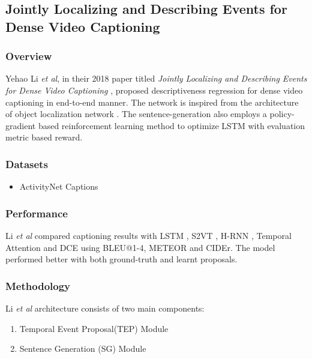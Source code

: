 \subsection{Jointly Localizing and Describing Events for Dense Video Captioning}

\subsubsection{Overview}

\par Yehao Li \textit{et al}, in their 2018 paper titled \textit{Jointly Localizing and Describing Events for Dense Video Captioning} \cite{li2018jointly}, proposed descriptiveness regression for dense video captioning in end-to-end manner. The network is inspired from the architecture of object localization network \cite{ren2016faster}. The sentence-generation also employs a policy-gradient based reinforcement learning method to optimize LSTM with evaluation metric based reward.


\subsubsection{Datasets}
\begin{itemize}
\item ActivityNet Captions
\end{itemize}

\subsubsection{Performance}
\par Li \textit{et al} compared captioning results with LSTM \cite{venugopalan2015translating}, S2VT \cite{venugopalan2015sequence}, H-RNN \cite{yu2016video}, Temporal Attention \cite{yao2015describing} and DCE \cite{krishna2017densecaptioning} using BLEU@1-4, METEOR and CIDEr. The model performed better with both ground-truth and learnt proposals. 


\subsubsection{Methodology}

\par Li \textit{et al} architecture consists of two main components:
\begin{enumerate}
	\item Temporal Event Proposal(TEP) Module
	\item Sentence Generation (SG) Module
\end{enumerate}

